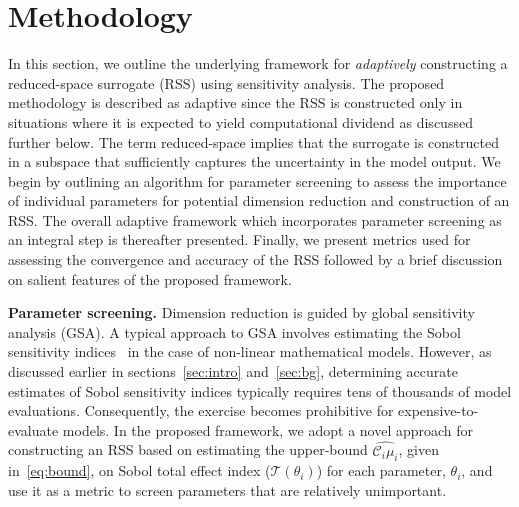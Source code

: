 \section{Methodology}
\label{sec:method}

%

In this section, we outline the underlying framework for \emph{adaptively}
constructing a reduced-space surrogate (RSS) using sensitivity analysis.  The
proposed methodology is described as adaptive since the RSS is constructed only
in situations where it is expected to yield computational dividend as discussed
further below.  The term reduced-space implies that the surrogate is
constructed in a subspace that sufficiently captures the uncertainty in the
model output. We begin by outlining an algorithm for parameter screening
to assess the importance of individual parameters for potential dimension
reduction and construction of an RSS. The overall adaptive framework 
which incorporates parameter screening as an integral step is thereafter
presented. Finally, we present metrics used for assessing the
convergence and accuracy of the RSS followed by a brief discussion on
salient features of the proposed framework. 

\textbf{Parameter screening.}
Dimension reduction is guided by global sensitivity analysis (GSA).  A typical
approach to GSA involves estimating the Sobol sensitivity
indices~\cite{Sobol:2001} in the case of non-linear mathematical models.
However, as discussed earlier in sections~\ref{sec:intro} and~\ref{sec:bg},
determining accurate estimates of Sobol sensitivity indices typically requires
tens of thousands of model evaluations. Consequently, the exercise becomes
prohibitive for expensive-to-evaluate models.  In the proposed framework, we
adopt a novel approach for constructing an RSS based on estimating the
upper-bound $\widehat{\mathcal{C}_i\mu_i}$, given in~\eqref{eq:bound}, on 
Sobol total effect index ($\mathcal{T}(\theta_i)$) for each 
parameter, $\theta_i$, and use it as a metric to screen 
parameters that are relatively unimportant. 

